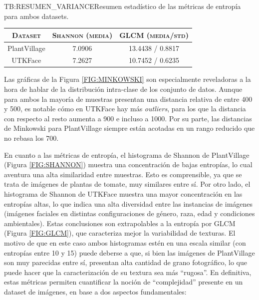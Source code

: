 \begin{table}[Resumen de varianza]{TB:RESUMEN_VARIANCE}{Resumen estadístico de las métricas de entropía para ambos datasets.}
    \small
    \begin{tabular}{|c|c|c|}
    \hline
        \textsc{Dataset} & \textsc{Shannon (media)} & \textsc{GLCM (media/std)} \\ \hline
        PlantVillage & 7.0906 & 13.4438 / 0.8817 \\ \hline
        UTKFace & 7.2627 & 10.7452 / 0.6235 \\ \hline
    \end{tabular}
\end{table}

Las gráficas de la Figura \ref{FIG:MINKOWSKI} son especialmente reveladoras a la hora de hablar de la distribución intra-clase de los conjunto de datos. Aunque para ambos la mayoría de muestras presentan una distancia relativa de entre 400 y 500, es notable cómo en UTKFace hay más \textit{outliers}, para los que la distancia con respecto al resto aumenta a 900 e incluso a 1000. Por su parte, las distancias de Minkowski para PlantVillage siempre están acotadas en un rango reducido que no rebasa los 700.

En cuanto a las métricas de entropía, el histograma de Shannon de PlantVillage (Figura \ref{FIG:SHANNON}) muestra una concentración de bajas entropías, lo cual aventura una alta similaridad entre muestras. Esto es comprensible, ya que se trata de imágenes de plantas de tomate, muy similares entre sí. Por otro lado, el histograma de Shannon de UTKFace muestra una mayor concentración en las entropías altas, lo que indica una alta diversidad entre las instancias de imágenes (imágenes faciales en distintas configuraciones de género, raza, edad y condiciones ambientales). Estas conclusiones son extrapolables a la entropía por GLCM (Figura \ref{FIG:GLCM}), que caracteriza mejor la variabilidad de texturas. El motivo de que en este caso ambos histogramas estén en una escala similar (con entropías entre 10 y 15) puede deberse a que, si bien las imágenes de PlantVillage son muy parecidas entre sí, presentan alta cantidad de grano fotográfico, lo que puede hacer que la caracterización de su textura sea más ``rugosa''. En definitiva, estas métricas permiten cuantificar la noción de ``complejidad'' presente en un dataset de imágenes, en base a dos aspectos fundamentales:

